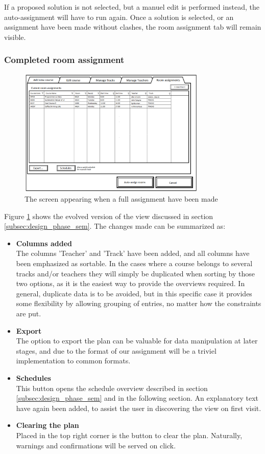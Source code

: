 If a proposed solution is not selected, but a manuel edit is performed instead, the auto-assignment will have to run again.
Once a solution is selected, or an assignment have been made without clashes, the room assignment tab will remain visible.

\subsubsection{Completed room assignment}
\begin{figure}[htb]
\begin{center}
\leavevmode
\includegraphics[width=0.8\textwidth]{images/courseplan2_Room_Assignments}
\end{center}
\caption{The screen appearing when a full assignment have been made}
\label{fig:courseplan2_assign}
\end{figure}

Figure \ref{fig:courseplan2_assign} shows the evolved version of the view discussed in section \ref{subsec:design_phase_sem}. The changes made can be summarized as:
\begin{itemize}
\item \textbf{Columns added} \\
The columns 'Teacher' and 'Track' have been added, and all columns have been emphasized as sortable. In the cases where a course belongs to several tracks and/or teachers they will simply be duplicated when sorting by those two options, as it is the easiest way to provide the overviews required. In general, duplicate data is to be avoided, but in this specific case it provides some flexibility by allowing grouping of entries, no matter how the constraints are put.
\item \textbf{Export} \\
The option to export the plan can be valuable for data manipulation at later stages, and due to the format of our assignment will be a triviel implementation to common formats.
\item \textbf{Schedules} \\
This button opens the schedule overview described in section \ref{subsec:design_phase_sem} and in the following section. An explanatory text have again been added, to assist the user in discovering the view on first visit. 
\item \textbf{Clearing the plan} \\
Placed in the top right corner is the button to clear the plan. Naturally, warnings and confirmations will be served on click.
\end{itemize}

